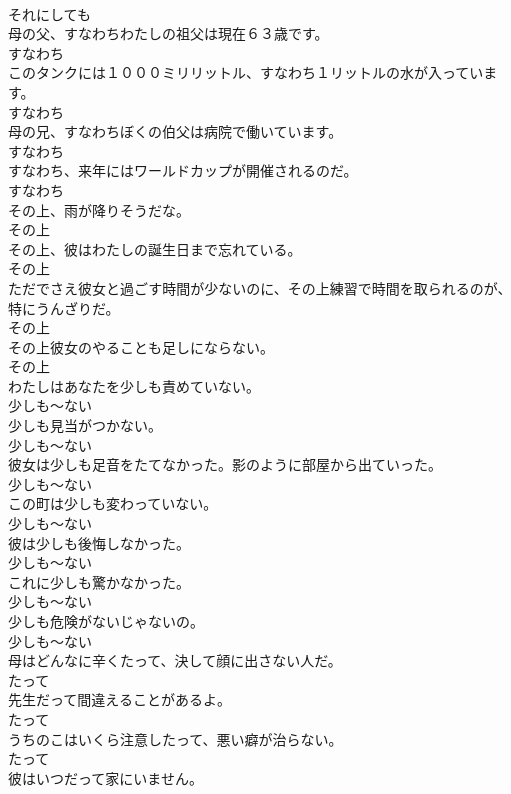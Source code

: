 \documentclass[8pt]{extreport}
\begin{document}
\begin{CJK}{UTF8}{min}
\\	それにしても
\\	母の父、すなわちわたしの祖父は現在６３歳です。	
\\	すなわち
\\	このタンクには１０００ミリリットル、すなわち１リットルの水が入っています。	
\\	すなわち
\\	母の兄、すなわちぼくの伯父は病院で働いています。	
\\	すなわち
\\	すなわち、来年にはワールドカップが開催されるのだ。	
\\	すなわち
\\	その上、雨が降りそうだな。	
\\	その上
\\	その上、彼はわたしの誕生日まで忘れている。	
\\	その上
\\	ただでさえ彼女と過ごす時間が少ないのに、その上練習で時間を取られるのが、特にうんざりだ。	
\\	その上
\\	その上彼女のやることも足しにならない。	
\\	その上
\\	わたしはあなたを少しも責めていない。	
\\	少しも～ない
\\	少しも見当がつかない。	
\\	少しも～ない
\\	彼女は少しも足音をたてなかった。影のように部屋から出ていった。	
\\	少しも～ない
\\	この町は少しも変わっていない。	
\\	少しも～ない
\\	彼は少しも後悔しなかった。	
\\	少しも～ない
\\	これに少しも驚かなかった。	
\\	少しも～ない
\\	少しも危険がないじゃないの。	
\\	少しも～ない
\\	母はどんなに辛くたって、決して顔に出さない人だ。	
\\	たって
\\	先生だって間違えることがあるよ。	
\\	たって
\\	うちのこはいくら注意したって、悪い癖が治らない。	
\\	たって
\\	彼はいつだって家にいません。	

\end{CJK}
\end{document}
